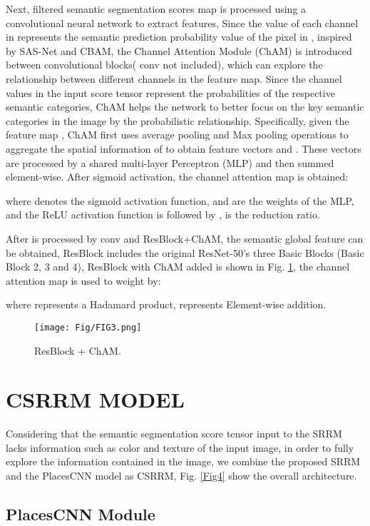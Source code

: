 \documentclass[conference]{IEEEtran}
\begin{document}
Next, filtered semantic segmentation scores map  is processed using a convolutional neural network to extract features, Since the value of each channel in  represents the semantic prediction probability value of the pixel in , inspired by SAS-Net\cite{ref17} and CBAM\cite{ref21}, the Channel Attention Module (ChAM)\cite{ref21} is introduced between convolutional blocks( conv not included), which can explore the relationship between different channels in the feature map. Since the channel values in the input score tensor represent the probabilities of the respective semantic categories, ChAM helps the network to better focus on the key semantic categories in the image by the probabilistic relationship. Specifically, given the feature map , ChAM first uses average pooling and Max pooling operations to aggregate the spatial information of  to obtain feature vectors  and . These vectors are processed by a shared multi-layer Perceptron (MLP) and then summed element-wise. After sigmoid activation, the channel attention map   is obtained:


where  denotes the sigmoid activation function,  and  are the weights of the MLP, and the ReLU activation function is followed by ,  is the reduction ratio.

After  is processed by  conv and ResBlock+ChAM, the semantic global feature  can be obtained, ResBlock includes the original ResNet-50’s three Basic Blocks (Basic Block 2, 3 and 4), ResBlock with ChAM added is shown in Fig. \ref{Fig3}, the channel attention map  is used to weight  by:

where  represents a Hadamard product,  represents Element-wise addition.

\begin{figure}[htbp]
    \centering
    \texttt{[image: Fig/FIG3.png]}
    \caption{ResBlock + ChAM.}
    \label{Fig3}
\end{figure}

\section{CSRRM MODEL}

Considering that the semantic segmentation score tensor input to the SRRM lacks information such as color and texture of the input image, in order to fully explore the information contained in the image, we combine the proposed SRRM and the PlacesCNN model as CSRRM, Fig. \ref{Fig4} show the overall architecture.

\subsection{PlacesCNN Module}
\end{document}
